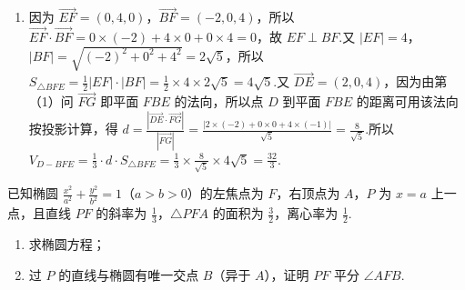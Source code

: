 \begin{solution}
\begin{enumerate}
\item 因为 \(\overrightarrow{EF}=\left(0,4,0\right)\)，\(\overrightarrow{BF}=\left(-2,0,4\right)\)，所以 \(\overrightarrow{EF}\cdot\overrightarrow{BF}=0\times\left(-2\right)+4\times 0+0\times 4=0\)，故 \(EF\perp BF\).又 \(\left|EF\right|=4\)，\(\left|BF\right|=\sqrt{\left(-2\right)^2+0^2+4^2}=2\sqrt5\)，所以 \(S_{\triangle BFE}=\frac12\left|EF\right|\cdot\left|BF\right|=\frac12\times 4\times 2\sqrt5=4\sqrt5\).又 \(\overrightarrow{DE}=\left(2,0,4\right)\)，因为由第（1）问 \(\overrightarrow{FG}\) 即平面 \(FBE\) 的法向，所以点 \(D\) 到平面 \(FBE\) 的距离可用该法向按投影计算，得 \(d=\frac{\left|\overrightarrow{DE}\cdot\overrightarrow{FG}\right|}{\left|\overrightarrow{FG}\right|}=\frac{\left|2\times\left(-2\right)+0\times 0+4\times\left(-1\right)\right|}{\sqrt5}=\frac{8}{\sqrt5}\).所以 \(V_{D-BFE}=\frac13\cdot d\cdot S_{\triangle BFE}=\frac13\times\frac{8}{\sqrt5}\times 4\sqrt5=\frac{32}{3}\).
\end{enumerate}
\end{solution}

\begin{problem}
已知椭圆 \(\frac{x^2}{a^2}+\frac{y^2}{b^2}=1\)（\(a>b>0\)）的左焦点为 \(F\)，右顶点为 \(A\)，\(P\) 为 \(x=a\) 上一点，且直线 \(PF\) 的斜率为 \(\frac13\)，\(\triangle PFA\) 的面积为 \(\frac32\)，离心率为 \(\frac12\).
\begin{enumerate}
\item 求椭圆方程；
\item 过 \(P\) 的直线与椭圆有唯一交点 \(B\)（异于 \(A\)），证明 \(PF\) 平分 \(\angle AFB\).
\end{enumerate}

\end{problem}

